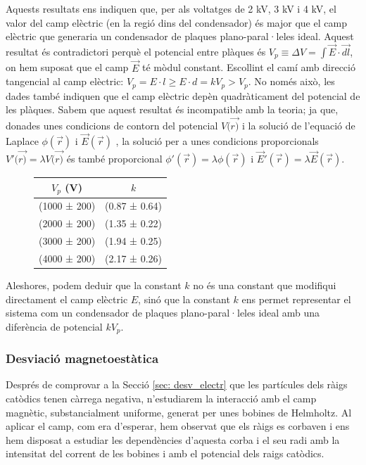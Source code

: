 \documentclass[11pt]{article}
\numberwithin{equation}{section}
\numberwithin{figure}{section}
\numberwithin{table}{section}
\begin{document}
Aquests resultats ens indiquen que, per als voltatges de 2 kV, 3 kV i 4 kV, el valor del camp elèctric (en la regió dins del condensador) és major que el camp elèctric que generaria un condensador de plaques plano-paral·leles ideal. Aquest resultat és contradictori perquè el potencial entre plàques és $V_p \equiv \Delta V = \int\vec{E}\cdot\vec{dl}$, on hem suposat que el camp $\vec{E}$ té mòdul constant. Escollint el camí amb direcció tangencial al camp elèctric: $V_p = E \cdot l\ge E\cdot d = kV_p > V_p$. No només això, les dades també indiquen que el camp elèctric depèn quadràticament del potencial de les plàques. Sabem que aquest resultat és incompatible amb la teoria; ja que, donades unes condicions de contorn del potencial $V(\vec{r)}$ i la solució de l'equació de Laplace $\phi(\vec{r})$ i $\vec{E}(\vec{r})$ , la solució per a unes condicions proporcionals $V'(\vec{r)}=\lambda V(\vec{r)}$ és també proporcional $\phi'(\vec{r}) = \lambda \phi(\vec{r})$ i $\vec{E}'(\vec{r}) = \lambda \vec{E}(\vec{r})$.

\begin{figure}[H]
    \centering
    \begin{minipage}{0.45\textwidth} 
        \centering
        \begin{tabular}{|c|c|}
            \hline
            $V_p$ (V)	&	$k$	\\\hline
            (1000 ± 200)	&	(0.87 ± 0.64)   \\\hline
            (2000 ± 200)	&	(1.35 ± 0.22)	\\\hline
            (3000 ± 200)	&	(1.94 ± 0.25)	\\\hline
            (4000 ± 200)	&	(2.17 ± 0.26)	\\\hline           
        \end{tabular}
        \label{tab:kvsVp}
    \end{minipage}
\end{figure}

Aleshores, podem deduir que la constant $k$ no és una constant que modifiqui directament el camp elèctric $E$, sinó que la constant $k$ ens permet representar el sistema com un condensador de plaques plano-paral·leles ideal amb una diferència de potencial $k V_p$. 

\subsubsection{Desviació magnetoestàtica}\label{sec: desv_magn}
Després de comprovar a la Secció \ref{sec: desv_electr} que les partícules dels ràigs catòdics tenen càrrega negativa, n'estudiarem la interacció amb el camp magnètic, substancialment uniforme, generat per unes bobines de Helmholtz. 
Al aplicar el camp, com era d'esperar, hem observat que els ràigs es corbaven i ens hem disposat a estudiar les dependències d'aquesta corba i el seu radi amb la intensitat del corrent de les bobines i amb el potencial dels raigs catòdics.
\end{document}
